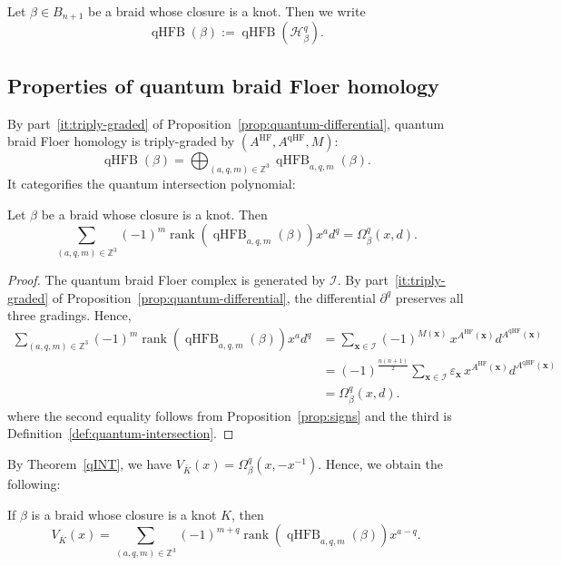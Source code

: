 \documentclass[11pt]{amsart}
\numberwithin{equation}{section}
\numberwithin{figure}{section}
\theoremstyle{definition}
\newcommand{\cH}{\mathcal{H}}
\newcommand{\cI}{\mathcal{I}}
\newcommand{\bZ}{\mathbb{Z}}
\newcommand{\mK}{\overline{K}}
\DeclareMathOperator{\rank}{rank}
\DeclareMathOperator{\qHF}{qHF}
\DeclareMathOperator{\qHFB}{qHFB}
\DeclareMathOperator{\HF}{HF}
\newcommand{\xs}{\boldsymbol{x}}
\begin{document}
\begin{defn}
    Let $\beta \in B_{n+1}$ be a braid whose closure is a knot. Then we write
    \[
    \qHFB(\beta) := \qHFB(\cH^q_\beta).
    \]
\end{defn}


\subsection{Properties of quantum braid Floer homology}

By part~\eqref{it:triply-graded} of Proposition~\ref{prop:quantum-differential}, quantum braid Floer homology is triply-graded by $(A^{\HF}, A^{\qHF}, M)$:
\[
\qHFB(\beta) = \bigoplus_{(a,q,m) \in \bZ^3} \qHFB_{a,q,m}(\beta).
\]
It categorifies the quantum intersection polynomial:

\begin{prop}\label{prop:categorification}
    Let $\beta$ be a braid whose closure is a knot. Then
    \[
    \sum_{(a,q,m) \in \bZ^3} (-1)^m \rank\left(\qHFB_{a,q,m}(\beta)\right)x^a d^q = \Omega^q_\beta(x,d).
    \]
\end{prop}

\begin{proof}
    The quantum braid Floer complex is generated by $\cI$. By part~\eqref{it:triply-graded} of Proposition~\ref{prop:quantum-differential}, the differential $\partial^q$ preserves all three gradings. Hence,
    \[
    \begin{split}
    \sum_{(a,q,m) \in \bZ^3} (-1)^m \rank\left(\qHFB_{a,q,m}(\beta)\right)x^a d^q &=
    \sum_{\xs\in \cI} (-1)^{M(\xs)} \, x^{A^{\HF}(\xs)} d^{A^{\qHF}(\xs)} \\
    &= (-1)^{\frac{n(n+1)}{2}}\sum_{\xs\in \cI} \varepsilon_{\xs} \, x^{A^{\HF}(\xs)} d^{A^{\qHF}(\xs)} \\
    &= \Omega^q_\beta(x,d).
    \end{split}
    \]
    where the second equality follows from Proposition~\ref{prop:signs} and the third is Definition~\ref{def:quantum-intersection}.
\end{proof}

By Theorem~\ref{qINT}, we have $V_{\mK}(x) = \Omega^q_\beta(x,-x^{-1})$. Hence, we obtain the following:

\begin{coro}\label{coro:Jones}
    If $\beta$ is a braid whose closure is a knot $K$, then
    \[
    V_{\mK}(x) = \sum_{(a,q,m) \in \bZ^3} (-1)^{m+q} \rank\left(\qHFB_{a,q,m}(\beta)\right)x^{a-q}.
    \]
\end{coro}
\end{document}
